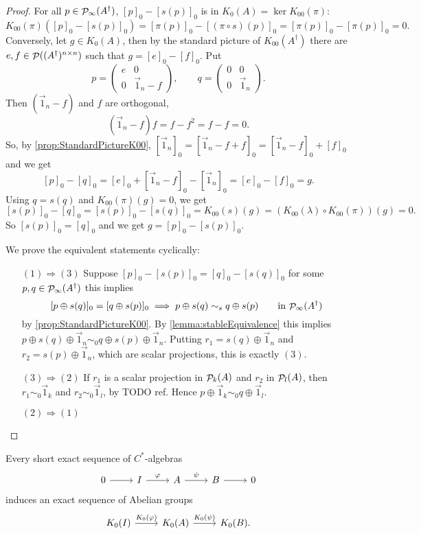\begin{proof}
For all $p\in\mathop{\mathcal{P}}\nolimits_\infty(A^\dagger)$, $[p]_0 - [s(p)]_0$ is in $K_0(A) = \ker K_{00}(\pi)$:
\[ K_{00}(\pi)([p]_0 - [s(p)]_0) = [\pi(p)]_0 - [(\pi\circ s)(p)]_0 = [\pi(p)]_0 - [\pi(p)]_0 = 0. \]
Conversely, let $g\in K_0(A)$, then by the standard picture of $K_{00}(A^\dagger)$ there are $e,f\in \mathop{\mathcal{P}}\nolimits((A^\dagger)^{n\times n})$ such that $g = [e]_0 - [f]_0$. Put
\[ p = \begin{pmatrix}
e & 0 \\ 0 & \vec{1}_n - f
\end{pmatrix}, \qquad q = \begin{pmatrix}
0 & 0 \\ 0 & \vec{1}_n
\end{pmatrix}. \]
Then $(\vec{1}_n - f)$ and $f$ are orthogonal,
\[ (\vec{1}_n - f)f = f - f^2 = f-f = 0. \]
So, by \ref{prop:StandardPictureK00}, $[\vec{1}_n]_0 = [\vec{1}_n -f + f]_0 = [\vec{1}_n -f]_0 + [f]_0$ and we get
\[ [p]_0 - [q]_0 = [e]_0 + [\vec{1}_n - f]_0 - [\vec{1}_n]_0 = [e]_0 - [f]_0 = g. \]
Using $q = s(q)$ and $K_{00}(\pi)(g) = 0$, we get
\[ [s(p)]_0 - [q]_0 = [s(p)]_0 - [s(q)]_0 = K_{00}(s)(g) = (K_{00}(\lambda)\circ K_{00}(\pi))(g) = 0. \]
So $[s(p)]_0 = [q]_0$ and we get $g = [p]_0 - [s(p)]_0$.

We prove the equivalent statements cyclically:
\begin{itemize}
\item[$\boxed{(1) \Rightarrow (3)}$] Suppose $[p]_0-[s(p)]_0 = [q]_0 - [s(q)]_0$ for some $p,q\in\mathop{\mathcal{P}}\nolimits_\infty(A^\dagger)$ this implies
\[ [p\oplus s(q)]_0 = [q\oplus s(p)]_0 \implies p\oplus s(q) \sim_s q\oplus s(p) \qquad \text{in $\mathop{\mathcal{P}}\nolimits_\infty(A^\dagger)$} \]
by \ref{prop:StandardPictureK00}. By \ref{lemma:stableEquivalence} this implies $p\oplus s(q)\oplus \vec{1}_n \sim_0 q \oplus s(p) \oplus \vec{1}_n$. Putting $r_1 = s(q)\oplus \vec{1}_n$ and $r_2 = s(p) \oplus \vec{1}_n$, which are scalar projections, this is exactly $(3)$.
\item[$\boxed{(3) \Rightarrow (2)}$] If $r_1$ is a scalar projection in $\mathop{\mathcal{P}}\nolimits_k(A)$ and $r_2$ in $\mathop{\mathcal{P}}\nolimits_l(A)$, then $r_1\sim_0 \vec{1}_k$ and $r_2 \sim_0 \vec{1}_l$, by TODO ref. Hence $p\oplus \vec{1}_k \sim_0 q \oplus \vec{1}_l$.
\item[$\boxed{(2) \Rightarrow (1)}$] 
\end{itemize}
\end{proof}

\begin{proposition}
Every short exact sequence of $C^*$-algebras
\[ \begin{tikzcd}
0 \rar & I \rar{\varphi} & A \rar{\psi} & B \rar & 0
\end{tikzcd} \]
induces an exact sequence of Abelian groups
\[ \begin{tikzcd}
K_0(I) \rar{K_0(\varphi)} & K_0(A) \rar{K_0(\psi)} & K_0(B).
\end{tikzcd} \]
\end{proposition}

